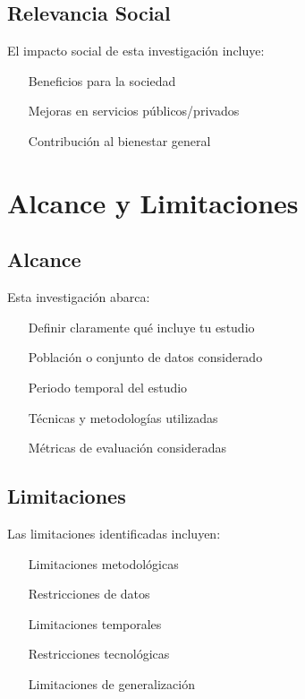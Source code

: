 \subsection{Relevancia Social}

El impacto social de esta investigación incluye:

\begin{itemize}
    \item [Beneficios para la sociedad]
    \item [Mejoras en servicios públicos/privados]
    \item [Contribución al bienestar general]
\end{itemize}

\section{Alcance y Limitaciones}

\subsection{Alcance}

Esta investigación abarca:

\begin{itemize}
    \item [Definir claramente qué incluye tu estudio]
    \item [Población o conjunto de datos considerado]
    \item [Periodo temporal del estudio]
    \item [Técnicas y metodologías utilizadas]
    \item [Métricas de evaluación consideradas]
\end{itemize}

\subsection{Limitaciones}

Las limitaciones identificadas incluyen:

\begin{itemize}
    \item [Limitaciones metodológicas]
    \item [Restricciones de datos]
    \item [Limitaciones temporales]
    \item [Restricciones tecnológicas]
    \item [Limitaciones de generalización]
\end{itemize}

